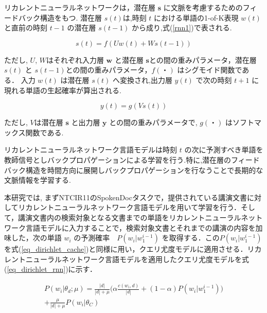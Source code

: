 リカレントニューラルネットワークは，潜在層 $\bm{s}$ に文脈を考慮するためのフィードバック構造をもつ. 潜在層 $s(t)$は,時刻 $t$ における単語の1-of-K表現 $w(t)$ と直前の時刻 $t−1$
の潜在層 $s(t−1)$ から成り,式(\ref{rnn1})で表される.

\begin{equation}
    s(t) = f(Uw(t) + Ws(t-1))
    \label{rnn1}
\end{equation}

ただし, $U$, $W$はそれぞれ入力層 $\bm{w}$ と潜在層 $\bm{s}$との間の重みパラメータ，潜在層 $s(t)$ と $s(t-1)$との間の重みパラメータ，$f(・)$ はシグモイド関数である．
入力 $w(t)$ は潜在層 $s(t)$ へ変換され,出力層 $y(t)$ で次の時刻 $t+1$ に現れる単語の生起確率が算出される.

\begin{equation}
		y(t) = g(Vs(t))
    \label{rnn3}
\end{equation}

ただし, $V$は潜在層 $\bm{s}$
と出力層 $\bm{y}$ との間の重みパラメータで, $g(・)$ はソフトマックス関数である.


リカレントニューラルネットワーク言語モデルは時刻 $t$ の次に予測すべき単語を教師信号としバックプロパゲーションによる学習を行う.特に,潜在層のフィードバック構造を時間方向に展開しバックプロパゲーションを行なうことで長期的な文脈情報を学習する.

本研究では, まずNTCIR11のSpokenDocタスクで，提供されている講演文書に対してリカレントニューラルネットワーク言語モデルを用いて学習を行う．そして，講演文書内の検索対象となる文書までの単語をリカレントニューラルネットワーク言語モデルに入力することで，検索対象文書とそれまでの講演の内容を加味した，次の単語 $w_i$ の予測確率　$P(w_i|w_1^{i-1})$ を取得する．この$P(w_i|w_1^{i-1})$ を式(\ref{eq_dirichlet_cache})と同様に用い，クエリ尤度モデルに適用させる．リカレントニューラルネットワーク言語モデルを適用したクエリ尤度モデルを式(\ref{eq_dirichlet_rnn})に示す．

\begin{equation}
\begin{split}
    P(w_i|\theta_d;\mu) = \frac{|d|}{|d|+\mu} \Biggl( \alpha \frac{c(w_i, d)}{|d|} + (1 - \alpha) P(w_i|w_1^{i-1}) \Biggr)\\
    + \frac{\mu}{|d|+\mu} P(w_i|\theta_C)
    \label{eq_dirichlet_rnn}
\end{split}
\end{equation}



